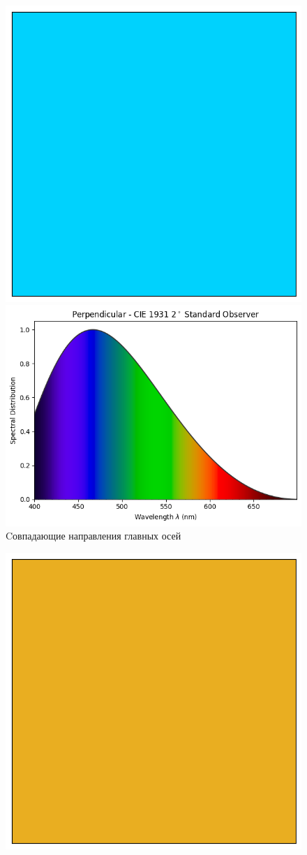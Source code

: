\documentclass[12pt, a4paper]{article}
\begin{document}
\begin{figure}[H]
    \begin{minipage}[t]{0.48\textwidth}
        \centering
        \includegraphics[width=0.5\linewidth]{pics/perpendicular.png} %
        \includegraphics[width=\linewidth]{pics/perpendicular_spectrum.png}
        Cовпадающие направления главных осей
    \end{minipage}
    \hfill
    \begin{minipage}[t]{0.48\textwidth}
        \centering
        \includegraphics[width=0.5\linewidth]{pics/parallel.png} %

\end{minipage}
\end{figure}
\end{document}
